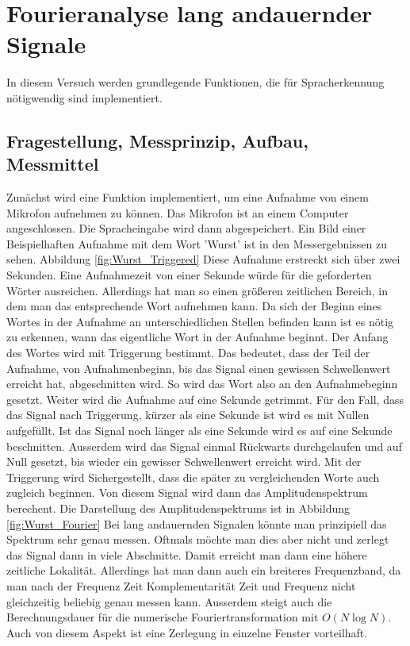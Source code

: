 %
%
\chapter{Fourieranalyse lang andauernder Signale}
\label{chap:VERSUCH_1}
In diesem Versuch werden grundlegende Funktionen, die für Spracherkennung nötigwendig sind implementiert.
\section{Fragestellung, Messprinzip, Aufbau, Messmittel}
\label{chap:VERSUCH_1_FRAGESTELLUNG}
Zunächst wird eine Funktion implementiert, um eine Aufnahme von einem Mikrofon aufnehmen zu können. Das Mikrofon ist an einem Computer angeschlossen. Die Spracheingabe wird dann abgespeichert.
Ein Bild einer Beispielhaften Aufnahme mit dem Wort 'Wurst' ist in den Messergebnissen zu sehen. Abbildung \ref{fig:Wurst_Triggered}
Diese Aufnahme erstreckt sich über zwei Sekunden. Eine Aufnahmezeit von einer Sekunde würde für die geforderten Wörter ausreichen. Allerdings hat man so einen größeren zeitlichen Bereich, in dem man das entsprechende Wort aufnehmen kann.
Da sich der Beginn eines Wortes in der Aufnahme an unterschiedlichen Stellen befinden kann ist es nötig zu erkennen, wann das eigentliche Wort in der Aufnahme beginnt. Der Anfang des Wortes wird mit Triggerung bestimmt. Das bedeutet, dass der Teil der Aufnahme, von Aufnahmenbeginn, bis das Signal einen gewissen Schwellenwert erreicht hat, abgeschnitten wird. So wird das Wort also an den Aufnahmebeginn gesetzt. Weiter wird die Aufnahme auf eine Sekunde getrimmt. Für den Fall, dass das Signal nach Triggerung, kürzer als eine Sekunde ist wird es mit Nullen aufgefüllt.
Ist das Signal noch länger als eine Sekunde wird es auf eine Sekunde beschnitten. Ausserdem wird das Signal einmal Rückwarts durchgelaufen und auf Null gesetzt, bis wieder ein gewisser Schwellenwert erreicht wird.
Mit der Triggerung wird Sichergestellt, dass die später zu vergleichenden Worte auch zugleich beginnen.
Von diesem Signal wird dann das Amplitudenspektrum berechent. Die Darstellung des Amplitudenspektrums ist in Abbildung \ref{fig:Wurst_Fourier}
Bei lang andauernden Signalen könnte man prinzipiell das Spektrum sehr genau messen. Oftmals möchte man dies aber nicht und zerlegt das Signal dann in viele Abschnitte. Damit erreicht man dann eine höhere zeitliche Lokalität. Allerdings hat man dann auch ein breiteres Frequenzband, da man nach der Frequenz Zeit Komplementarität Zeit und Frequenz nicht gleichzeitig beliebig genau messen kann. \cite[S.7]{Franz2015c} Ausserdem steigt auch die Berechnungsdauer für die numerische Fouriertransformation mit $O(N \log N)$. Auch von diesem Aspekt ist eine Zerlegung in einzelne Fenster vorteilhaft. \cite[S.16]{Franz2015c}
